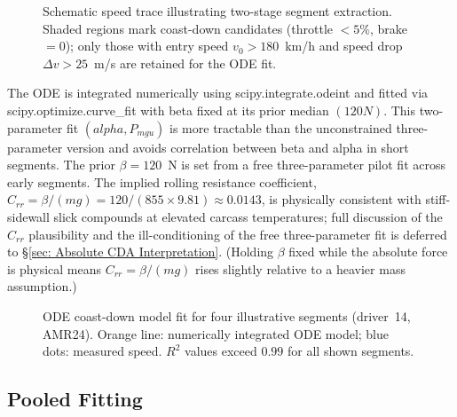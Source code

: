 \begin{figure}[h]
\caption{Schematic speed trace illustrating two-stage segment extraction. Shaded regions mark coast-down candidates (throttle $<5\%$, brake $=0$); only those with entry speed $v_0>180$~km/h and speed drop $\Delta v>25$~m/s are retained for the ODE fit.}
\label{fig: segment extraction}
\end{figure}

The ODE is integrated numerically using scipy.\allowbreak integrate.\allowbreak odeint and fitted via scipy.\allowbreak optimize.\allowbreak curve\_fit\cite{SciPy_Algorithms} with beta fixed at its prior median $(120 N)$. This two-parameter fit $(alpha, P_{mgu})$ is more tractable than the unconstrained three-parameter version and avoids correlation between beta and alpha in short segments. The prior $\beta = 120$~N is set from a free three-parameter pilot fit across early segments. The implied rolling resistance coefficient, $C_{rr} = \beta/(mg) = 120/(855 \times 9.81) \approx 0.0143$, is physically consistent with stiff-sidewall slick compounds at elevated carcass temperatures; full discussion of the $C_{rr}$ plausibility and the ill-conditioning of the free three-parameter fit is deferred to \S\ref{sec: Absolute CDA Interpretation}. (Holding $\beta$ fixed while the absolute force is physical means $C_{rr} = \beta/(mg)$ rises slightly relative to a heavier mass assumption.)

\begin{figure}[h]
    \centering
    
    \caption[ODE coast-down model fit for four sample segments (driver 14, AMR24). Orange line shows the numerically integrated model; blue dots show measured speed. R2 values exceed 0.99 for all shown segments.]{ODE coast-down model fit for four illustrative segments (driver~14, AMR24). Orange line: numerically integrated ODE model; blue dots: measured speed. $R^2$ values exceed $0.99$ for all shown segments.}
    \label{fig: ODE coast-down model fit}
\end{figure}

\subsection{Pooled Fitting}
\label{sec: Pooled Fitting}

